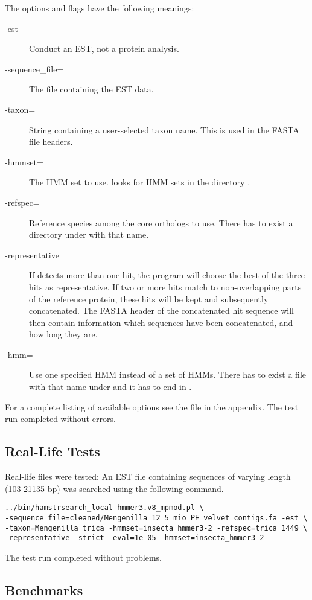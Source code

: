 The options and flags have the following meanings:
\begin{description}
	\item[-est] Conduct an EST, not a protein analysis.
	\item[-sequence\_file=] The file containing the EST data.
	\item[-taxon=] String containing a user-selected taxon name. This is used in the FASTA file headers.
	\item[-hmmset=] The HMM set to use. \hamstr looks for HMM sets in the directory .
	\item[-refspec=] Reference species among the core orthologs to use. There has to exist a directory under  with that name.
	\item[-representative] If \hamstr detects more than one hit, the program will choose the best of the three hits as representative. If two or more hits match to non-overlapping parts of the reference protein, these hits will be kept and subsequently concatenated. The FASTA header of the concatenated hit sequence will then contain information which sequences have been concatenated, and how long they are.
	\item[-hmm=] Use one specified HMM instead of a set of HMMs. There has to exist a file with that name under  and it has to end in .
\end{description}
For a complete listing of available options see the \hamstr {} file in the appendix. The test run completed without errors.

\subsection{Real-Life Tests}

Real-life files were tested: An EST file containing sequences of varying length
(103-21135 bp) was searched using the following command.

\begin{verbatim}
../bin/hamstrsearch_local-hmmer3.v8_mpmod.pl \
-sequence_file=cleaned/Mengenilla_12_5_mio_PE_velvet_contigs.fa -est \
-taxon=Mengenilla_trica -hmmset=insecta_hmmer3-2 -refspec=trica_1449 \
-representative -strict -eval=1e-05 -hmmset=insecta_hmmer3-2 
\end{verbatim}

The test run completed without problems.

\subsection{Benchmarks}

